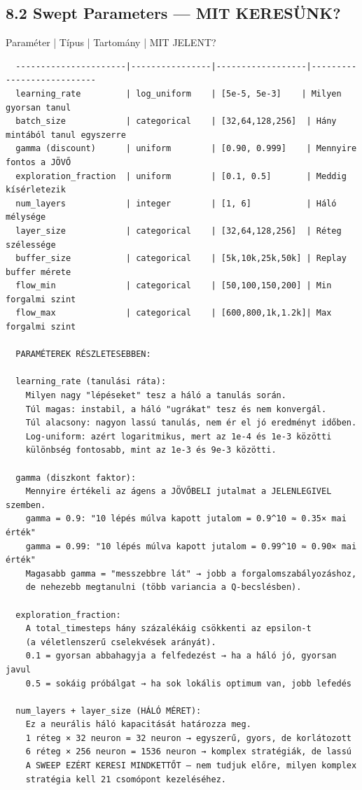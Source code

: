 \documentclass[11pt,a4paper]{article}
\begin{document}
\subsection*{8.2 Swept Parameters — MIT KERESÜNK?}
Paraméter             | Típus          | Tartomány        | MIT JELENT?
\vspace{1em}\begin{verbatim}
  ----------------------|----------------|------------------|---------------------------
  learning_rate         | log_uniform    | [5e-5, 5e-3]    | Milyen gyorsan tanul
  batch_size            | categorical    | [32,64,128,256]  | Hány mintából tanul egyszerre
  gamma (discount)      | uniform        | [0.90, 0.999]    | Mennyire fontos a JÖVŐ
  exploration_fraction  | uniform        | [0.1, 0.5]       | Meddig kísérletezik
  num_layers            | integer        | [1, 6]           | Háló mélysége
  layer_size            | categorical    | [32,64,128,256]  | Réteg szélessége
  buffer_size           | categorical    | [5k,10k,25k,50k] | Replay buffer mérete
  flow_min              | categorical    | [50,100,150,200] | Min forgalmi szint
  flow_max              | categorical    | [600,800,1k,1.2k]| Max forgalmi szint

  PARAMÉTEREK RÉSZLETESEBBEN:

  learning_rate (tanulási ráta):
    Milyen nagy "lépéseket" tesz a háló a tanulás során.
    Túl magas: instabil, a háló "ugrákat" tesz és nem konvergál.
    Túl alacsony: nagyon lassú tanulás, nem ér el jó eredményt időben.
    Log-uniform: azért logaritmikus, mert az 1e-4 és 1e-3 közötti
    különbség fontosabb, mint az 1e-3 és 9e-3 közötti.

  gamma (diszkont faktor):
    Mennyire értékeli az ágens a JÖVŐBELI jutalmat a JELENLEGIVEL szemben.
    gamma = 0.9: "10 lépés múlva kapott jutalom = 0.9^10 ≈ 0.35× mai érték"
    gamma = 0.99: "10 lépés múlva kapott jutalom = 0.99^10 ≈ 0.90× mai érték"
    Magasabb gamma = "messzebbre lát" → jobb a forgalomszabályozáshoz,
    de nehezebb megtanulni (több variancia a Q-becslésben).

  exploration_fraction:
    A total_timesteps hány százalékáig csökkenti az epsilon-t
    (a véletlenszerű cselekvések arányát).
    0.1 = gyorsan abbahagyja a felfedezést → ha a háló jó, gyorsan javul
    0.5 = sokáig próbálgat → ha sok lokális optimum van, jobb lefedés

  num_layers + layer_size (HÁLÓ MÉRET):
    Ez a neurális háló kapacitását határozza meg.
    1 réteg × 32 neuron = 32 neuron → egyszerű, gyors, de korlátozott
    6 réteg × 256 neuron = 1536 neuron → komplex stratégiák, de lassú
    A SWEEP EZÉRT KERESI MINDKETTŐT — nem tudjuk előre, milyen komplex
    stratégia kell 21 csomópont kezeléséhez.

\end{verbatim}
\end{document}
